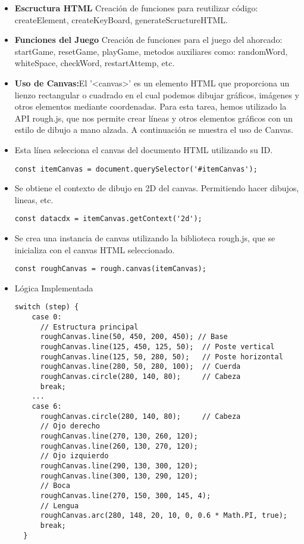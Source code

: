 \documentclass{article}
\begin{document}
\begin{itemize}
\item{\textbf{Escructura HTML} Creación de funciones para reutilizar código: createElement, createKeyBoard, generateScructureHTML.}
\item{\textbf{Funciones del Juego} Creación de funciones para el juego del ahorcado: startGame, resetGame, playGame, metodos auxiliares como: randomWord, whiteSpace, checkWord, restartAttemp, etc.}
\item{\textbf{Uso de Canvas:}El '<canvas>' es un elemento HTML que proporciona un lienzo rectangular o cuadrado en el cual podemos dibujar gráficos, imágenes y otros elementos mediante coordenadas. Para esta tarea, hemos utilizado la API rough.js, que nos permite crear líneas y otros elementos gráficos con un estilo de dibujo a mano alzada. A continuación se muestra el uso de Canvas.}
\item{Esta línea selecciona el canvas del documento HTML utilizando su ID.}
\begin{lstlisting}[style=ascii-tree]
const itemCanvas = document.querySelector('#itemCanvas');
\end{lstlisting}
\item{ Se obtiene el contexto de dibujo en 2D del canvas. Permitiendo hacer dibujos, lineas, etc.}
\begin{lstlisting}[style=ascii-tree]
const datacdx = itemCanvas.getContext('2d');
\end{lstlisting}
\item{Se crea una instancia de canvas utilizando la biblioteca rough.js, que se inicializa con el canvas HTML seleccionado.}
\begin{lstlisting}[style=ascii-tree]
const roughCanvas = rough.canvas(itemCanvas);
\end{lstlisting}
\item{Lógica Implementada}
\begin{lstlisting}[style=ascii-tree]
switch (step) {
    case 0:
      // Estructura principal
      roughCanvas.line(50, 450, 200, 450); // Base
      roughCanvas.line(125, 450, 125, 50);  // Poste vertical
      roughCanvas.line(125, 50, 280, 50);   // Poste horizontal
      roughCanvas.line(280, 50, 280, 100);  // Cuerda
      roughCanvas.circle(280, 140, 80);     // Cabeza
      break;
    ...
    case 6:
      roughCanvas.circle(280, 140, 80);     // Cabeza
      // Ojo derecho
      roughCanvas.line(270, 130, 260, 120);
      roughCanvas.line(260, 130, 270, 120);
      // Ojo izquierdo
      roughCanvas.line(290, 130, 300, 120);
      roughCanvas.line(300, 130, 290, 120);
      // Boca
      roughCanvas.line(270, 150, 300, 145, 4);
      // Lengua
      roughCanvas.arc(280, 148, 20, 10, 0, 0.6 * Math.PI, true);
      break;
  }
\end{lstlisting}

\end{itemize}
\end{document}
